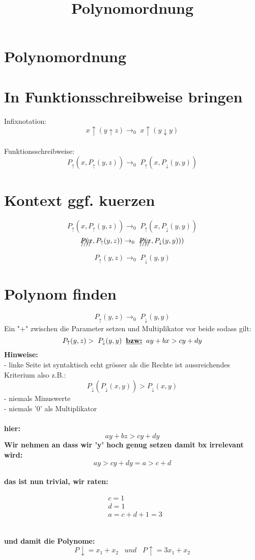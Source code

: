 \documentclass{article}
\title{Polynomordnung}
\date{}
\begin{document}
	\section*{Polynomordnung}
	\section{In Funktionsschreibweise bringen}
	Infixnotation:
	\[x \uparrow ( y \uparrow z) \rightarrow_{0}\; x \uparrow (y \downarrow y)\]\\
	Funktionsschreibweise:
	\[ P_{\uparrow}(x,P_{\uparrow}(y,z)) \rightarrow_{0} \; P_{\uparrow}(x,P_{\downarrow}(y,y))\]
	\section{Kontext ggf. kuerzen}
	\[ P_{\uparrow}(x,P_{\uparrow}(y,z)) \rightarrow_{0} \; P_{\uparrow}(x,P_{\downarrow}(y,y))\]
	\[\xout{P(x},P_{\uparrow}(y,z)) \rightarrow_{0} \; \xout{P(x},P_{\downarrow}(y,y)))\]
	\[P_{\uparrow}(y,z) \rightarrow_{0} \;P_{\downarrow}(y,y)\]
	\section{Polynom finden}
	\[P_{\uparrow}(y,z) \rightarrow_{0} \;P_{\downarrow}(y,y)\]
	Ein "+" zwischen die Parameter setzen und Multiplikator vor beide sodass gilt:
	\[P_{\uparrow}(y,z) > \;P_{\downarrow}(y,y)\;\;\textbf{\underline{bzw:}}\;\;ay+bx>cy+dy\]
	\textbf{Hinweise:}\\
	- linke Seite ist syntaktisch echt gr\"osser als die Rechte ist aussreichendes Kriterium also z.B.:
	\[ P_{\downarrow}( P_{\downarrow}(x,y) ) > P_{\downarrow}(x,y) \]
	- niemals Minuswerte \\
	- niemals '0' als Multiplikator\\\\
	\textbf{hier:}
		\[ay+bz>cy+dy\]
	\textbf{Wir nehmen an dass wir 'y' hoch genug setzen damit bx irrelevant wird:}\\
		\[ay>cy+dy = a>c+d \]
	\\ \textbf{das ist nun trivial, wir raten:}
	\begin{fleqn}
		\begin{align*}
			&c = 1 \\
			&d = 1 \\
			&a = c+d+1 = 3
		\end{align*}
	\end{fleqn} \\
	\textbf{und damit die Polynome:}\\
	\[P\downarrow = x_1+x_2 \;\;\; und \;\;\; P\uparrow = 3x_1+x_2 \] \\
\end{document}
